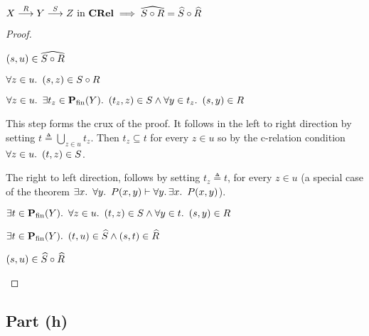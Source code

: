 \begin{prop}\label{prop:rel-hat-comp}
  $X\overset{R}{\longrightarrow}Y\overset{S}{\longrightarrow}Z\text{ in }\mathbf{CRel}\implies\widehat{S\circ R} = \widehat{S}\circ\widehat{R}$
  \begin{proof}~\\
    \begin{itemize}
      \step
        $(s,u)\in\widehat{S\circ R}$
        \marginnote{\Hyp}

      \step[\iffs]
        $\forall z\in u\ldotp~(s,z)\in S\circ R$
        \marginnote{\Def-~$\widehat{\cdot}$}

      \step[\iffs]
        $\forall z\in u\ldotp~\exists t_z\in\mathbf{P}_{\operatorname{fin}}(Y)\ldotp~(t_z,z)\in S\land\forall y\in t_z\ldotp~(s,y)\in R$

        \addtolength{\itemsep}{\baselineskip}
        \step
          This step forms the crux of the proof. It follows in the left to right direction by setting $t \triangleq \bigcup\limits_{z\in u} t_z$. Then $t_z\subseteq t$ for every $z\in u$ so by the c-relation condition $\forall z\in u\ldotp~(t,z)\in S$.

        \step
          The right to left direction, follows by setting $t_z \triangleq t$, for every ${z\in u}$ (a special case of the theorem ${\exists x\ldotp~\forall y\ldotp~P(x, y)\vdash\forall y\ldotp\exists x\ldotp~P(x,y)}$).

      \step[\iffs]
        $\exists t\in\mathbf{P}_{\operatorname{fin}}(Y)\ldotp~\forall z\in u\ldotp~(t,z)\in S\land\forall y\in t\ldotp~(s,y)\in R$

        \addtolength{\itemsep}{-1\baselineskip}
      \step[\iffs]
        $\exists t\in\mathbf{P}_{\operatorname{fin}}(Y)\ldotp~(t,u)\in\widehat{S}\land (s,t)\in\widehat{R}$
        \marginnote{\Def-~$\widehat{\cdot}$}

      \step[\iffs]
        $(s, u)\in\widehat{S}\circ\widehat{R}$
        \qedhere

    \end{itemize}
  \end{proof}
\end{prop}

\subsection{Part (h)}\label{sec:q-2-h}

